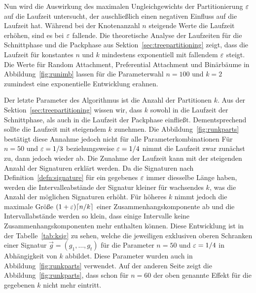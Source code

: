 Nun wird die Auswirkung des maximalen Ungleichgewichts der Partitionierung $\varepsilon$ auf die Laufzeit untersucht, der auschließlich einen negativen Einfluss auf die Laufzeit hat.
Während bei der Knotenanzahl $n$ steigende Werte die Laufzeit erhöhen, sind es bei $\varepsilon$ fallende.
Die theoretische Analyse der Laufzeiten für die Schnittphase und die Packphase aus Sektion~\ref{sec:treepartitioning} zeigt, dass die Laufzeit für konstantes $n$ und $k$ mindestens exponentiell mit fallendem $\varepsilon$ steigt.
Die Werte für Random Attachment, Preferential Attachment und Binärbäume in Abbildung~\ref{fig:runimb} lassen für die Parameterwahl $n = 100$ und $k = 2$ zumindest eine exponentielle Entwicklung erahnen.

Der letzte Parameter des Algorithmus ist die Anzahl der Partitionen $k$. 
Aus der Sektion~\ref{sec:treepartitioning} wissen wir, dass $k$ sowohl in die Laufzeit der Schnittphase, als auch in die Laufzeit der Packphase einfließt.
Dementsprechend sollte die Laufzeit mit steigendem $k$ zunehmen.
Die Abbildung~\ref{fig:runkparts} bestätigt diese Annahme jedoch nicht für alle Parameterkombinationen
Für $n=50$ und $\varepsilon=1/3$ beziehungsweise $\varepsilon=1/4$ nimmt die Laufzeit zwar zunächst zu, dann jedoch wieder ab.
Die Zunahme der Laufzeit kann mit der steigenden Anzahl der Signaturen erklärt werden.
Da die Signaturen nach Definition~\ref{defn:signature} für ein gegebenes $\varepsilon$ immer diesselbe Länge haben, werden die Intervalleabstände der Signatur kleiner für wachsendes $k$, was die Anzahl der möglichen Signaturen erhöht.
Für höheres $k$ nimmt jedoch die maximale Größe $(1 + \varepsilon) \lceil n/k\rceil$ einer Zusammenhangskomponente ab und die Intervallabstände werden so klein, dass einige Intervalle keine Zusammenhangskomponenten mehr enthalten können. 
Diese Entwicklung ist in der Tabelle~\ref{tab:ksig} zu sehen, welche die jeweiligen exklusiven oberen Schranken einer Signatur $\vec{g} = (g_1, \ldots, g_t)$ für die Parameter $n = 50$ und $\varepsilon = 1/4$ in Abhängigkeit von $k$ abbildet.
Diese Parameter wurden auch in Abbildung~\ref{fig:runkparts} verwendet.
Auf der anderen Seite zeigt die Abbildung~\ref{fig:runkparts}, dass schon für $n=60$ der oben genannte Effekt für die gegebenen $k$ nicht mehr eintritt. 

